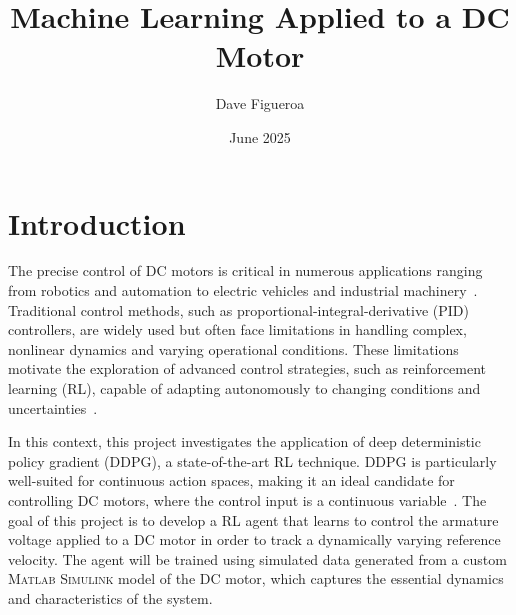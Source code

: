 


\title{\textbf{Machine Learning Applied to a DC Motor}}
\author{Dave Figueroa}
\date{June 2025}
\maketitle

\section{Introduction}

The precise control of DC motors is critical in numerous applications ranging from robotics and automation to electric vehicles and industrial machinery~\cite{BookUmans2013,Sul2011}. Traditional control methods, such as proportional-integral-derivative (PID) controllers, are widely used but often face limitations in handling complex, nonlinear dynamics and varying operational conditions. These limitations motivate the exploration of advanced control strategies, such as reinforcement learning (RL), capable of adapting autonomously to changing conditions and uncertainties~\cite{Arulkumaran2017}.

In this context, this project investigates the application of deep deterministic policy gradient (DDPG), a state-of-the-art RL technique. DDPG is particularly well-suited for continuous action spaces, making it an ideal candidate for controlling DC motors, where the control input is a continuous variable~\cite{Lillicrap2019}. The goal of this project is to develop a RL agent that learns to control the armature voltage applied to a DC motor in order to track a dynamically varying reference velocity. The agent will be trained using simulated data generated from a custom \textsc{Matlab Simulink} model of the DC motor, which captures the essential dynamics and characteristics of the system.

